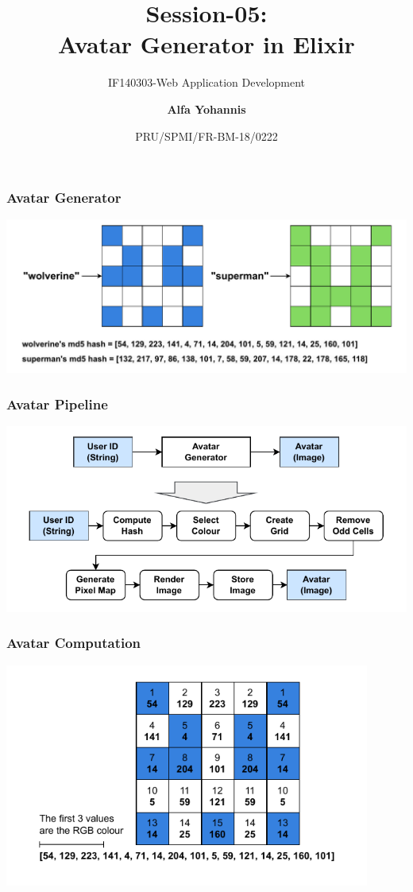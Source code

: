 \documentclass[aspectratio=169, table]{beamer}
\subtitle{IF140303-Web Application Development}
\title{\LARGE{Session-05:\\ Avatar Generator in Elixir}
	\vspace{20pt}}
\date[Serial]{\scriptsize {PRU/SPMI/FR-BM-18/0222}}
\author[Pradita]{\small{\textbf{Alfa Yohannis}}}
\begin{document}
	
	\frame{\titlepage}
	
	
		\begin{frame}
			\frametitle{Avatar Generator}
			\begin{center}
				\includegraphics[width=1\textwidth]{../../assets/avatar-example.pdf}
			\end{center}
		\end{frame}
	

	\begin{frame}
		\frametitle{Avatar Pipeline}
		\vspace{20pt}
		\begin{center}
			\includegraphics[width=1\textwidth]{../../assets/avatar-pipeline.pdf}
		\end{center}
	\end{frame}

	\begin{frame}
		\frametitle{Avatar Computation}
		\vspace{20pt}
		\begin{center}
			\includegraphics[width=0.9\textwidth]{../../assets/avatar-computation.pdf}
		\end{center}
	\end{frame}
\end{document}
